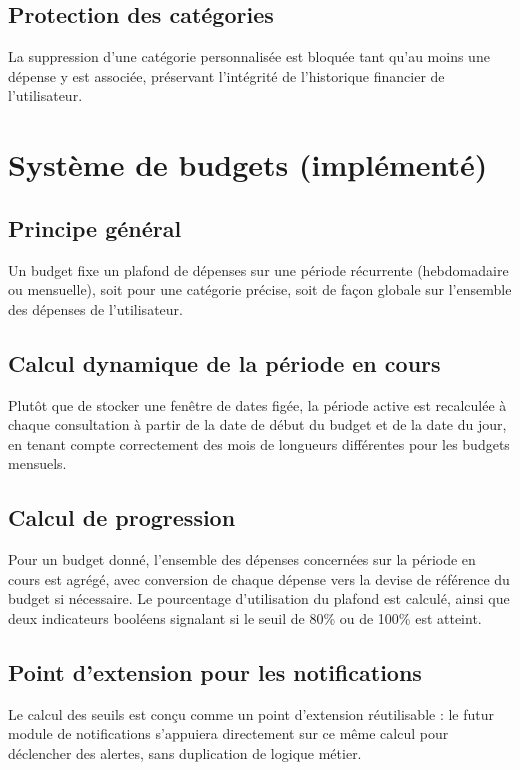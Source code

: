 \documentclass[11pt,a4paper]{article}
\begin{document}
\subsection{Protection des catégories}
La suppression d'une catégorie personnalisée est bloquée tant qu'au moins une dépense y est associée, préservant l'intégrité de l'historique financier de l'utilisateur.

\section{Système de budgets (implémenté)}

\subsection{Principe général}
Un budget fixe un plafond de dépenses sur une période récurrente (hebdomadaire ou mensuelle), soit pour une catégorie précise, soit de façon globale sur l'ensemble des dépenses de l'utilisateur.

\subsection{Calcul dynamique de la période en cours}
Plutôt que de stocker une fenêtre de dates figée, la période active est recalculée à chaque consultation à partir de la date de début du budget et de la date du jour, en tenant compte correctement des mois de longueurs différentes pour les budgets mensuels.

\subsection{Calcul de progression}
Pour un budget donné, l'ensemble des dépenses concernées sur la période en cours est agrégé, avec conversion de chaque dépense vers la devise de référence du budget si nécessaire. Le pourcentage d'utilisation du plafond est calculé, ainsi que deux indicateurs booléens signalant si le seuil de 80\% ou de 100\% est atteint.

\subsection{Point d'extension pour les notifications}
Le calcul des seuils est conçu comme un point d'extension réutilisable : le futur module de notifications s'appuiera directement sur ce même calcul pour déclencher des alertes, sans duplication de logique métier.
\end{document}
